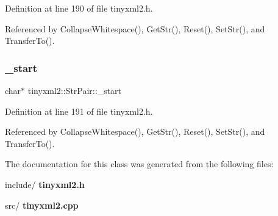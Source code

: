 Definition at line 190 of file tinyxml2.\+h.



Referenced by Collapse\+Whitespace(), Get\+Str(), Reset(), Set\+Str(), and Transfer\+To().

\mbox{\label{classtinyxml2_1_1_str_pair_acfd8687916a02833cc55c279460d2f4a}} 
\subsubsection{\_start}
{\footnotesize\ttfamily char$\ast$ tinyxml2\+::\+Str\+Pair\+::\+\_\+start\hspace{0.3cm}{\ttfamily [private]}}



Definition at line 191 of file tinyxml2.\+h.



Referenced by Collapse\+Whitespace(), Get\+Str(), Reset(), Set\+Str(), and Transfer\+To().



The documentation for this class was generated from the following files\+:\begin{DoxyCompactItemize}
\item 
include/\textbf{ tinyxml2.\+h}\item 
src/\textbf{ tinyxml2.\+cpp}\end{DoxyCompactItemize}
